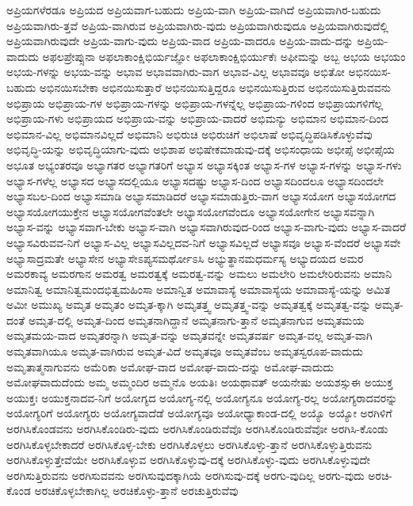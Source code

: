 {ಅಪ್ರಿಯಗಳೆರಡೂ
ಅಪ್ರಿಯದ
ಅಪ್ರಿಯವಾಗ-ಬಹುದು
ಅಪ್ರಿಯ-ವಾಗಿ
ಅಪ್ರಿಯ-ವಾಗಿದೆ
ಅಪ್ರಿಯವಾಗಿರ-ಬಹುದು
ಅಪ್ರಿಯವಾಗಿರು-ತ್ತವೆ
ಅಪ್ರಿಯ-ವಾಗಿರುವ
ಅಪ್ರಿಯವಾಗಿರು-ವುದು
ಅಪ್ರಿಯವಾಗಿರುವುದೂ
ಅಪ್ರಿಯವಾಗಿರುವುದೆಲ್ಲಿ
ಅಪ್ರಿಯವಾಗಿರುವುದೇ
ಅಪ್ರಿಯ-ವಾಗು-ವುದು
ಅಪ್ರಿಯ-ವಾದ
ಅಪ್ರಿಯ-ವಾದರೂ
ಅಪ್ರಿಯ-ವಾದು-ದನ್ನು
ಅಪ್ರಿಯ-ವಾದುದು
ಅಫಲಪ್ರೇಪ್ಸುನಾ
ಅಫಲಾಕಾಂಕ್ಷಿಭಿರ್ಯಜ್ಞೋ
ಅಫಲಾಕಾಂಕ್ಷಿಭಿರ್ಯುಕೆಃ
ಅಫೀಮನ್ನು
ಅಬ್ಬ
ಅಭಯ
ಅಭಯಂ
ಅಭಯ-ಗಳನ್ನು
ಅಭಯ-ವನ್ನು
ಅಭಾವ
ಅಭಾವವಾಗಿರು-ವಾಗ
ಅಭಾವ-ವಿಲ್ಲ
ಅಭಾವವೂ
ಅಭಿತೋ
ಅಭಿನಯಿಸ-ಬಹುದು
ಅಭಿನಯಿಸಬೇಕಾ
ಅಭಿನಯಿಸುತ್ತಾರೆ
ಅಭಿನಯಿಸುತ್ತಿದ್ದರೂ
ಅಭಿನಯಿಸುತ್ತಿರುವ
ಅಭಿನಯಿಸುತ್ತಿರುವವನು
ಅಭಿಪ್ರಾಯ
ಅಭಿಪ್ರಾಯ-ಗಳ
ಅಭಿಪ್ರಾಯ-ಗಳನ್ನು
ಅಭಿಪ್ರಾಯ-ಗಳನ್ನೆಲ್ಲ
ಅಭಿಪ್ರಾಯ-ಗಳಿಂದ
ಅಭಿಪ್ರಾಯಗಳಿಗೆಲ್ಲ
ಅಭಿಪ್ರಾಯ-ಗಳು
ಅಭಿಪ್ರಾಯದ
ಅಭಿಪ್ರಾಯ-ವನ್ನು
ಅಭಿಪ್ರಾಯ-ವಾದರೆ
ಅಭಿಮನ್ಯು
ಅಭಿಮಾನ
ಅಭಿಮಾನ-ದಿಂದ
ಅಭಿಮಾನ-ವಿಲ್ಲ
ಅಭಿಮಾನವಿಲ್ಲದೆ
ಅಭಿಮಾನಿ
ಅಭಿರುಚಿ
ಅಭಿರುಚಿಗೆ
ಅಭಿಲಾಷೆ
ಅಭಿವೃದ್ಧಿಪಡಿಸಿಕೊಳ್ಳುವೆವು
ಅಭಿವೃದ್ಧಿ-ಯನ್ನು
ಅಭಿವೃದ್ಧಿಯಾಗು-ವುದು
ಅಭಿಶಾಪ
ಅಭಿಷೇಕಮಾಡುವು-ದಕ್ಕೆ
ಅಭಿಸಂಧಾಯ
ಅಭೀಪ್ಸೆ
ಅಭೀಪ್ಸೆಯ
ಅಭೂತ
ಅಭ್ಯಂತರವೂ
ಅಭ್ಯಾಗತರ
ಅಭ್ಯಾಗತರಿಗೆ
ಅಭ್ಯಾಸ
ಅಭ್ಯಾಸಕ್ಕಿಂತ
ಅಭ್ಯಾಸ-ಗಳ
ಅಭ್ಯಾಸ-ಗಳನ್ನು
ಅಭ್ಯಾಸ-ಗಳು
ಅಭ್ಯಾಸ-ಗಳೆಲ್ಲ
ಅಭ್ಯಾಸದ
ಅಭ್ಯಾಸದಲ್ಲಿಯೂ
ಅಭ್ಯಾಸದಷ್ಟು
ಅಭ್ಯಾಸ-ದಿಂದ
ಅಭ್ಯಾಸದಿಂದಲೂ
ಅಭ್ಯಾಸದಿಂದಲೇ
ಅಭ್ಯಾಸಬಲ-ದಿಂದ
ಅಭ್ಯಾಸಮಾಡಿ
ಅಭ್ಯಾಸಮಾಡಿದರೆ
ಅಭ್ಯಾಸಮಾಡುತ್ತಿರು-ವಾಗ
ಅಭ್ಯಾಸಯೋಗ
ಅಭ್ಯಾಸಯೋಗದ
ಅಭ್ಯಾಸಯೋಗಯುಕ್ತೇನ
ಅಭ್ಯಾಸಯೋಗವೆಂತಲೇ
ಅಭ್ಯಾಸಯೋಗವೆಂದೂ
ಅಭ್ಯಾಸಯೋಗೇನ
ಅಭ್ಯಾಸವನ್ನಾಗಿ
ಅಭ್ಯಾಸ-ವನ್ನು
ಅಭ್ಯಾಸವಾಗ-ಬೇಕು
ಅಭ್ಯಾಸ-ವಾಗಿ
ಅಭ್ಯಾಸವಾಗಿರುವುದ-ರಿಂದ
ಅಭ್ಯಾಸ-ವಾಗು-ವುದು
ಅಭ್ಯಾಸ-ವಾದರೆ
ಅಭ್ಯಾಸವಿರುವವ-ನಿಗೆ
ಅಭ್ಯಾಸ-ವಿಲ್ಲ
ಅಭ್ಯಾಸವಿಲ್ಲದವ-ನಿಗೆ
ಅಭ್ಯಾಸವಿಲ್ಲದೆ
ಅಭ್ಯಾಸವೂ
ಅಭ್ಯಾಸ-ವೆಂದರೆ
ಅಭ್ಯಾಸವೇ
ಅಭ್ಯಾಸಾದ್ರಮತೇ
ಅಭ್ಯಾಸೇನ
ಅಭ್ಯಾಸೇಽಪ್ಯಸಮರ್ಥೋಽಸಿ
ಅಭ್ಯುತ್ಥಾನಮಧರ್ಮಸ್ಯ
ಅಭ್ಯುದಯದ
ಅಮರ
ಅಮರಕಾವ್ಯ
ಅಮರಗಾನ
ಅಮರತ್ವ
ಅಮರತ್ವಕ್ಕೆ
ಅಮರತ್ವ-ವನ್ನು
ಅಮಲು
ಅಮಲೇರಿ
ಅಮಲೇರಿರುವನು
ಅಮಾನಿ
ಅಮಾನಿತ್ವ
ಅಮಾನಿತ್ವಮಂದಭಿತ್ವಮಹಿಂಸಾ
ಅಮಾನ್ವಿತ
ಅಮಾವಾಸ್ಯೆ
ಅಮಾವಾಸ್ಯೆಯ
ಅಮಾವಾಸ್ಯೆ-ಯನ್ನು
ಅಮಿತ
ಅಮೀ
ಅಮುಖ್ಯ
ಅಮೃತ
ಅಮೃತಂ
ಅಮೃತ-ಕ್ಕಾಗಿ
ಅಮೃತತ್ತ್ವ
ಅಮೃತತ್ತ್ವ-ವನ್ನು
ಅಮೃತತ್ವಕ್ಕೆ
ಅಮೃತತ್ವ-ವನ್ನು
ಅಮೃತ-ದಂತೆ
ಅಮೃತ-ದಲ್ಲಿ
ಅಮೃತ-ದಿಂದ
ಅಮೃತನಾಗಿದ್ದಾನೆ
ಅಮೃತನಾಗು-ತ್ತಾನೆ
ಅಮೃತನಾಗುವ
ಅಮೃತಮಯ
ಅಮೃತಮಯ-ವಾದ
ಅಮೃತರನ್ನಾಗಿ
ಅಮೃತ-ವನ್ನು
ಅಮೃತವನ್ನೇ
ಅಮೃತವರ್ಷ
ಅಮೃತ-ವಲ್ಲ
ಅಮೃತ-ವಾಗಿ
ಅಮೃತವಾಗಿಯೂ
ಅಮೃತ-ವಾಗಿರುವ
ಅಮೃತ-ವಿದೆ
ಅಮೃತವೂ
ಅಮೃತವೆಂಬ
ಅಮೃತಸ್ವರೂಪ-ವಾದುದು
ಅಮೃತಾತ್ಮನಾಗುವನು
ಅಮೆರಿಕಾ
ಅಮೋಘ-ವಾದ
ಅಮೋಘ-ವಾದು-ದನ್ನು
ಅಮೋಘ-ವಾದುದು
ಅಮೋಘವಾದುದೆಂದು
ಅಮ್ಮ
ಅಮ್ಮಂದಿರ
ಅಮ್ಮನೊ
ಅಯತಿಃ
ಅಯಥಾವತ್
ಅಯನೇಷು
ಅಯಶಸ್ಸುಈ
ಅಯುಕ್ತ
ಅಯುಕ್ತಃ
ಅಯುಕ್ತನಾದವ-ನಿಗೆ
ಅಯೋಗ್ಯದ
ಅಯೋಗ್ಯ-ನಲ್ಲಿ
ಅಯೋಗ್ಯನೂ
ಅಯೋಗ್ಯ-ರಲ್ಲ
ಅಯೋಗ್ಯರಾದವರನ್ನು
ಅಯೋಗ್ಯರಿಗೆ
ಅಯೋಗ್ಯರು
ಅಯೋಗ್ಯವಾದೆಡೆ
ಅಯೋಗ್ಯವೂ
ಅಯೋಧ್ಯಾಕಾಂಡ-ದಲ್ಲಿ
ಅಯ್ಯೊ
ಅಯ್ಯೋ
ಅರಗಿಳಿಗೆ
ಅರಗಿಸಿಕೊಂಡವನು
ಅರಗಿಸಿಕೊಂಡಿರು-ವುದು
ಅರಗಿಸಿಕೊಂಡಿರುವೆವೊ
ಅರಗಿಸಿಕೊಂಡಿರುವೆವೋ
ಅರಗಿಸಿ-ಕೊಂಡು
ಅರಗಿಸಿಕೊಳ್ಳಬೇಕಾದರೆ
ಅರಗಿಸಿಕೊಳ್ಳ-ಬೇಕು
ಅರಗಿಸಿಕೊಳ್ಳಲು
ಅರಗಿಸಿಕೊಳ್ಳು-ತ್ತಾನೆ
ಅರಗಿಸಿಕೊಳ್ಳುತ್ತಿರುವನು
ಅರಗಿಸಿಕೊಳ್ಳುತ್ತೇವೆಯೇ
ಅರಗಿಸಿಕೊಳ್ಳುವ
ಅರಗಿಸಿಕೊಳ್ಳುವು-ದಕ್ಕೆ
ಅರಗಿಸಿಕೊಳ್ಳು-ವುದು
ಅರಗಿಸಿಕೊಳ್ಳುವುದೇ
ಅರಗಿಸುತ್ತಿರುವನು
ಅರಗಿಸುವವನು
ಅರಗಿಸುವುದಕ್ಕಾಗಿಯೆ
ಅರಗಿಸುವು-ದಕ್ಕೆ
ಅರಗು-ವುದಿಲ್ಲ
ಅರಗು-ವುದು
ಅರಚಿ-ಕೊಂಡ
ಅರಚಿಕೊಳ್ಳಬೇಕಾಗಿಲ್ಲ
ಅರಚಿಕೊಳ್ಳು-ತ್ತಾನೆ
ಅರಚುತ್ತಿರುವೆವು
}
